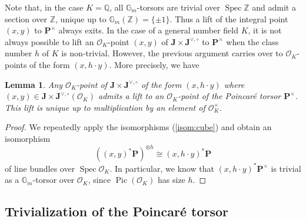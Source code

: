 \documentclass[11pt,oneside]{amsart}
\theoremstyle{plain}
\newtheorem{lemma}[theorem]{Lemma}
\theoremstyle{definition}
\def\G{{\bf G}}
\DeclareMathOperator{\Gm}{\mathbb{G}_m}
\DeclareMathOperator{\Pic}{Pic}
\DeclareMathOperator{\spec}{Spec} \DeclareMathOperator{\sgn}{sign}
\def\Z{\mathbb{Z}}
\def\Q{\mathbb{Q}}
\def\J{\mathbf{J}}
\def\Jo{\mathbf{J}^{\vee,\circ}}
\def\G{\mathbb{G}}
\def\P{\mathbf{P}}
\def\Gm{{\mathbb{G}_m}}
\def\oh{\mathcal{O}}
\begin{document}
Note that, in the case $K=\Q$, all $\Gm$-torsors are trivial over $\spec \Z$ and admit a section over $\Z$, unique up to $\G_m(\Z)=\{ \pm 1 \}$. Thus a lift of the integral point $(x, y)$ to $\P^\times$ always exits. 
 In the case of a general number field $K$, it is not always possible to lift an $\oh_K$-point $(x, y)$ of $\J\times \Jo$ to $\P^\times$ when the class number $h$ of $K$ is non-trivial. However, the previous argument carries over to $\oh_K$-points of the form $(x, h\cdot y)$. More precisely, we have 

\begin{lemma}\label{lem:h}
Any $\oh_K$-point of $\J\times \Jo$ of the form $(x, h\cdot y)$ where $(x, y)\in \J\times \Jo (\oh_K)$ admits a lift to an $\oh_K$-point of the Poincar\'e torsor $\P^\times$. This lift is unique up to multiplication by an element of $\oh_K^\times$.
\end{lemma}

\begin{proof}
We repeatedly apply the isomorphisms (\ref{isom:cube}) %
and obtain an isomorphism
$$
    ((x, y)^* \P)^{\otimes h} \cong (x, h\cdot y)^* \P
$$
of line bundles over $\spec \oh_K$. In particular, we know that $(x, h\cdot y)^* \P^\times$ is trivial as a $\G_m$-torsor over $\oh_K$, since $\Pic (\oh_K)$ has size $h$. 
\end{proof}



\subsection{Trivialization of the Poincar\'e torsor} \label{trivialization}




\end{document}
